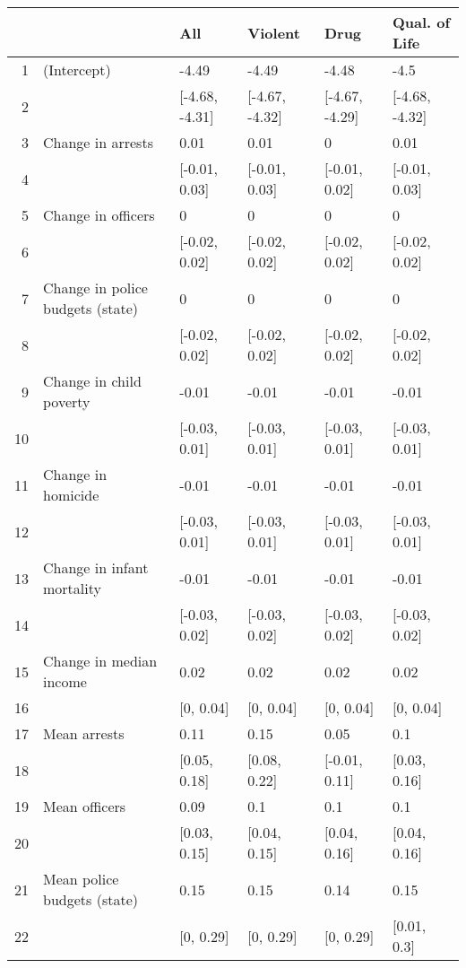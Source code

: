 \begin{table}[ht]
\centering
\begin{tabular}{rlllll}
  \hline
 &   & All & Violent & Drug & Qual. of Life \\ 
  \hline
1 & (Intercept) & -4.49 & -4.49 & -4.48 & -4.5 \\ 
  2 &  & [-4.68, -4.31] & [-4.67, -4.32] & [-4.67, -4.29] & [-4.68, -4.32] \\ 
  3 & Change in arrests & 0.01 & 0.01 & 0 & 0.01 \\ 
  4 &  & [-0.01, 0.03] & [-0.01, 0.03] & [-0.01, 0.02] & [-0.01, 0.03] \\ 
  5 & Change in officers & 0 & 0 & 0 & 0 \\ 
  6 &  & [-0.02, 0.02] & [-0.02, 0.02] & [-0.02, 0.02] & [-0.02, 0.02] \\ 
  7 & Change in police budgets (state) & 0 & 0 & 0 & 0 \\ 
  8 &  & [-0.02, 0.02] & [-0.02, 0.02] & [-0.02, 0.02] & [-0.02, 0.02] \\ 
  9 & Change in child poverty & -0.01 & -0.01 & -0.01 & -0.01 \\ 
  10 &  & [-0.03, 0.01] & [-0.03, 0.01] & [-0.03, 0.01] & [-0.03, 0.01] \\ 
  11 & Change in homicide & -0.01 & -0.01 & -0.01 & -0.01 \\ 
  12 &  & [-0.03, 0.01] & [-0.03, 0.01] & [-0.03, 0.01] & [-0.03, 0.01] \\ 
  13 & Change in infant mortality & -0.01 & -0.01 & -0.01 & -0.01 \\ 
  14 &  & [-0.03, 0.02] & [-0.03, 0.02] & [-0.03, 0.02] & [-0.03, 0.02] \\ 
  15 & Change in median income & 0.02 & 0.02 & 0.02 & 0.02 \\ 
  16 &  & [0, 0.04] & [0, 0.04] & [0, 0.04] & [0, 0.04] \\ 
  17 & Mean arrests & 0.11 & 0.15 & 0.05 & 0.1 \\ 
  18 &  & [0.05, 0.18] & [0.08, 0.22] & [-0.01, 0.11] & [0.03, 0.16] \\ 
  19 & Mean officers & 0.09 & 0.1 & 0.1 & 0.1 \\ 
  20 &  & [0.03, 0.15] & [0.04, 0.15] & [0.04, 0.16] & [0.04, 0.16] \\ 
  21 & Mean police budgets (state) & 0.15 & 0.15 & 0.14 & 0.15 \\ 
  22 &  & [0, 0.29] & [0, 0.29] & [0, 0.29] & [0.01, 0.3] \\ 

\end{tabular}
\end{table}

